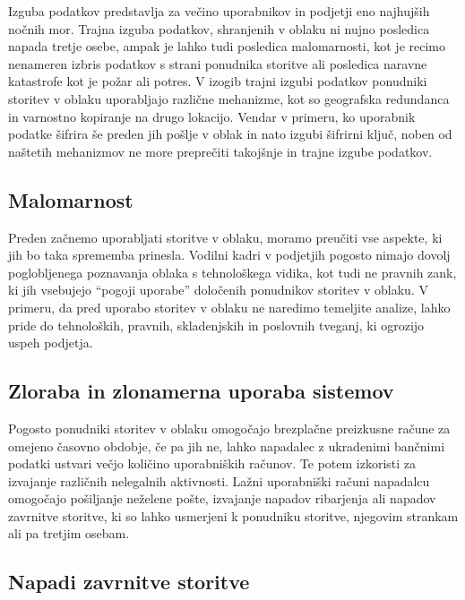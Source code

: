 \documentclass[12pt,a4paper,openany,tikz]{book}
\theoremstyle{plain}
\theoremstyle{definition}
\begin{document}
Izguba podatkov predstavlja za večino uporabnikov in podjetji eno najhujših nočnih mor. Trajna izguba podatkov, shranjenih v oblaku ni nujno posledica napada tretje osebe, ampak je lahko tudi posledica malomarnosti, kot je recimo nenameren izbris podatkov s strani ponudnika storitve ali posledica naravne katastrofe kot je požar ali potres. V izogib trajni izgubi podatkov ponudniki storitev v oblaku uporabljajo različne mehanizme, kot so geografska redundanca in varnostno kopiranje na drugo lokacijo. Vendar v primeru, ko uporabnik podatke šifrira še preden jih pošlje v oblak in nato izgubi šifrirni ključ, noben od naštetih mehanizmov ne more preprečiti takojšnje in trajne izgube podatkov.

\subsection{Malomarnost}
\label{sub:Malomarnost}

Preden začnemo uporabljati storitve v oblaku, moramo preučiti vse aspekte, ki jih bo taka sprememba prinesla. Vodilni kadri v podjetjih pogosto nimajo dovolj poglobljenega poznavanja oblaka s tehnološkega vidika, kot tudi ne pravnih zank, ki jih vsebujejo ``pogoji uporabe'' določenih ponudnikov storitev v oblaku. V primeru, da pred uporabo storitev v oblaku ne naredimo temeljite analize, lahko pride do tehnoloških, pravnih, skladenjskih in poslovnih tveganj, ki ogrozijo uspeh podjetja.

\subsection{Zloraba in zlonamerna uporaba sistemov}
\label{sub:Zloraba in zlonamerna uporaba sistemov}

Pogosto ponudniki storitev v oblaku omogočajo brezplačne preizkusne račune za omejeno časovno obdobje, če pa jih ne, lahko napadalec z ukradenimi bančnimi podatki ustvari večjo količino uporabniških računov. Te potem izkoristi za izvajanje različnih nelegalnih aktivnosti. Lažni uporabniški računi napadalcu omogočajo pošiljanje neželene pošte, izvajanje napadov ribarjenja ali napadov zavrnitve storitve, ki so lahko usmerjeni k ponudniku storitve, njegovim strankam ali pa tretjim osebam.

\subsection{Napadi zavrnitve storitve}
\label{subs:Napadi zavrnitve storitve}
\end{document}

